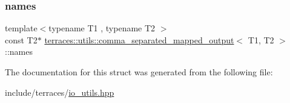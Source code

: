 \mbox{\label{structterraces_1_1utils_1_1comma__separated__mapped__output_aff76c42bae39a26d7b19932ad1c3f324}} 
\subsubsection{\texorpdfstring{names}{names}}
{\footnotesize\ttfamily template$<$typename T1 , typename T2 $>$ \\
const T2$\ast$ \hyperlink{structterraces_1_1utils_1_1comma__separated__mapped__output}{terraces\+::utils\+::comma\+\_\+separated\+\_\+mapped\+\_\+output}$<$ T1, T2 $>$\+::names}



The documentation for this struct was generated from the following file\+:\begin{DoxyCompactItemize}
\item 
include/terraces/\hyperlink{io__utils_8hpp}{io\+\_\+utils.\+hpp}\end{DoxyCompactItemize}
